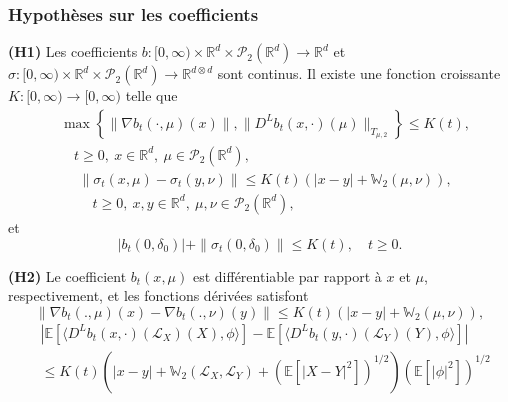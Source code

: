 \documentclass[12pt,a4paper,twoside]{book}%
\theoremstyle{definition}
\numberwithin{equation}{section}
\begin{document}
\subsubsection{Hypothèses sur les coefficients}
\textbf{(H1)} Les coefficients $b : [0, \infty) \times \mathbb{R}^d \times \mathcal{P}_2(\mathbb{R}^d) \to \mathbb{R}^d$ et $\sigma : [0, \infty) \times \mathbb{R}^d \times \mathcal{P}_2(\mathbb{R}^d) \to \mathbb{R}^{d \otimes d}$ sont continus. Il existe une fonction croissante $K : [0, \infty) \to [0, \infty)$ telle que
\begin{equation}\label{eq:1.2.3}
	\begin{aligned}
	&\max\left\{ \|\nabla b_t(\cdot, \mu)(x)\|, \| D^L b_t(x, \cdot)(\mu) \|_{T_{\mu,2}} \right\} \leq K(t),\\ &\quad t \geq 0,\ x \in \mathbb{R}^d,\ \mu \in \mathcal{P}_2(\mathbb{R}^d),
	\end{aligned}
\end{equation}
\begin{equation}\label{eq:1.2.4}
	\begin{aligned}
	&\|\sigma_t(x, \mu) - \sigma_t(y, \nu)\|\leq K(t)(|x - y| + \mathbb{W}_2(\mu, \nu)),\\ &\quad t \geq 0,\ x, y \in \mathbb{R}^d,\ \mu, \nu \in \mathcal{P}_2(\mathbb{R}^d),
	\end{aligned}
\end{equation}
et
\begin{equation}\label{eq:1.2.5}
	|b_t(0, \delta_0)| + \|\sigma_t(0, \delta_0)\| \leq K(t), \quad t \geq 0.
\end{equation}

\textbf{(H2)} Le coefficient $b_t(x, \mu)$ est différentiable par rapport à $x$ et $\mu$, respectivement, et les fonctions dérivées satisfont
\begin{equation}\label{eq:1.2.6}
	\|\nabla b_t(., \mu)(x) - \nabla b_t(., \nu)(y)\| \leq K(t)(|x - y| + \mathbb{W}_2(\mu, \nu)),
\end{equation}
\[
\begin{aligned}
	&\left| \mathbb{E}\left[ \langle D^L b_t(x, \cdot)(\mathcal{L}_X)(X), \phi \rangle \right] 
	- \mathbb{E}\left[ \langle D^L b_t(y, \cdot)(\mathcal{L}_Y)(Y), \phi \rangle \right] \right| \\
	&\leq K(t)\left( |x - y| + \mathbb{W}_2(\mathcal{L}_X, \mathcal{L}_Y) + \left( \mathbb{E}[|X - Y|^2] \right)^{1/2} \right) \left( \mathbb{E}[|\phi|^2] \right)^{1/2}
\end{aligned}
\]
\end{document}
